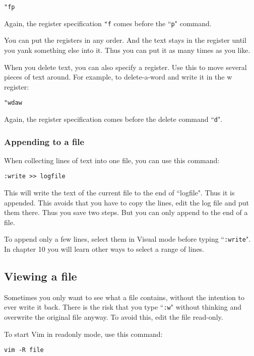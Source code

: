  \begin{Verbatim}[samepage=true]
 "fp
 \end{Verbatim}

Again, the register specification \texttt{"f} comes before the ``\texttt{p}" command.

You can put the registers in any order.
And the text stays in the register until you yank something else into it.
Thus you can put it as many times as you like.

When you delete text, you can also specify a register.
Use this to move several pieces of text around.
For example, to delete-a-word and write it in the w register:

 \begin{Verbatim}[samepage=true]
 "wdaw
 \end{Verbatim}

Again, the register specification comes before the delete command ``\texttt{d}".

\subsubsection{Appending to a file}
When collecting lines of text into one file, you can use this command:

 \begin{Verbatim}[samepage=true]
 :write >> logfile
 \end{Verbatim}

This will write the text of the current file to the end of ``logfile".
Thus it is appended.
This avoids that you have to copy the lines, edit the log file and put them there.
Thus you save two steps.
But you can only append to the end of a file.

To append only a few lines, select them in Visual mode before typing ``\texttt{:write}".
In chapter 10 you will learn other ways to select a range of lines.

\subsection{Viewing a file}
Sometimes you only want to see what a file contains, without the intention to ever write it back.
There is the risk that you type ``\texttt{:w}" without thinking and overwrite the original file anyway.
To avoid this, edit the file read-only.

To start Vim in readonly mode, use this command:

 \begin{Verbatim}[samepage=true]
 vim -R file
 \end{Verbatim}

